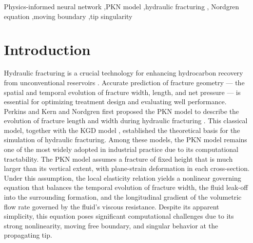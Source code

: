 \documentclass[a4paper,fleqn]{cas-sc}
\begin{document}
\begin{keywords}
Physics-informed neural network \sep PKN model \sep hydraulic fracturing \sep
Nordgren equation \sep moving boundary \sep tip singularity
\end{keywords}

\maketitle

\section{Introduction}\label{sec:intro}

Hydraulic fracturing is a crucial technology for enhancing
hydrocarbon recovery from unconventional reservoirs
\cite{Economides2000}. Accurate prediction of fracture geometry ---
the spatial and temporal evolution of fracture width, length, and net
pressure --- is essential for optimizing treatment design and evaluating
well performance. Perkins and Kern and Nordgren first proposed the PKN
model to describe the evolution of fracture length and width during
hydraulic fracturing \cite{Nordgren1972}. This classical model, together
with the KGD model \cite{Ref_KGD}, established the theoretical basis for
the simulation of hydraulic fracturing. Among these models, the PKN
model remains one of the most widely adopted in industrial practice due
to its computational tractability. The PKN model assumes a fracture of
fixed height that is much larger than its vertical extent, with
plane-strain deformation in each cross-section. Under this assumption,
the local elasticity relation yields a nonlinear governing equation that
balances the temporal evolution of fracture width, the fluid leak-off
into the surrounding formation, and the longitudinal gradient of the
volumetric flow rate governed by the fluid's viscous resistance. Despite
its apparent simplicity, this equation poses significant computational
challenges due to its strong nonlinearity, moving free boundary, and
singular behavior at the propagating tip.
\end{document}
